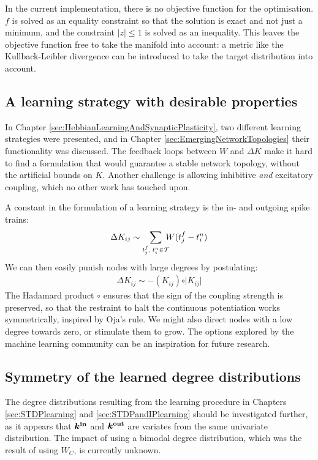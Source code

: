 In the current implementation, there is no objective function for the optimisation. $f$ is solved as an equality constraint so that the solution is exact and not just a minimum, and the constraint $| z | \leq 1$ is solved as an inequality. This leaves the objective function free to take the manifold into account: a metric like the Kullback-Leibler divergence can be introduced to take the target distribution into account. 


\subsection{A learning strategy with desirable properties}
In Chapter \ref{sec:HebbianLearningAndSynapticPlasticity}, two different learning strategies were presented, and in Chapter \ref{sec:EmergingNetworkTopologies} their functionality was discussed. The feedback loops between $W$ and $\Delta K$ make it hard to find a formulation that would guarantee a stable network topology, without the artificial bounds on $K$. Another challenge is allowing inhibitive \textsl{and} excitatory coupling, which no other work has touched upon.

A constant in the formulation of a learning strategy is the in- and outgoing spike trains: 
\begin{align}
\Delta K_{ij} \sim \sum_{t_{j}^{f}, \: t_i^{n} \in \mathcal{T}} \hspace{-2mm} W (t_{j}^{f}-t_i^{n} )
\end{align}
We can then easily punish nodes with large degrees by postulating:
\begin{align}
\Delta K_{ij} \sim - (K_{ij}) \circ \rvert K_{ij} \rvert
\end{align}
The Hadamard product $\circ$ ensures that the sign of the coupling strength is preserved, so that the restraint to halt the continuous potentiation works symmetrically, inspired by Oja's rule\cite{ChrolCannon2014}. We might also direct nodes with a low degree towards zero, or stimulate them to grow. The options explored by the machine learning community can be an inspiration for future research.


\subsection{Symmetry of the learned degree distributions}
The degree distributions resulting from the learning procedure in Chapters \ref{sec:STDPlearning} and \ref{sec:STDPandIPlearning} should be investigated further, as it appears that ${\boldsymbol{k^{\rm in}}}$ and $\boldsymbol{{k^{\rm out}}}$ are variates from the same univariate distribution. The impact of using a bimodal degree distribution, which was the result of using $W_C$, is currently unknown.

